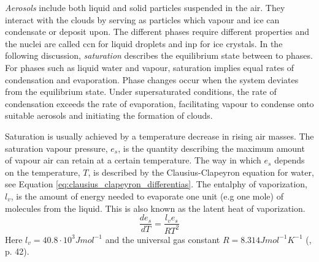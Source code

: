 \textit{Aerosols} include both liquid and solid particles suspended in the air. They interact with the clouds by serving as particles which vapour and ice can condensate or deposit upon. The different phases require different properties and the nuclei are called \acrfull{ccn} for liquid droplets and \acrfull{inp} for ice crystals. 
In the following discussion, \textit{saturation} describes the equilibrium state between to phases. %
For phases such as liquid water and vapour, saturation implies equal rates of condensation and evaporation. Phase changes occur when the system deviates from the equilibrium state. Under supersaturated conditions, the rate of condensation exceeds the rate of evaporation, facilitating vapour to condense onto suitable aerosols and initiating the formation of clouds. 

Saturation is usually achieved by a temperature decrease in rising air masses. The saturation vapour pressure, $e_s$, is the quantity describing the maximum amount of vapour air can retain at a certain temperature. The way in which $e_s$ depends on the temperature, $T$, is described by the Clausius-Clapeyron equation for water, see Equation \eqref{eq:clausius_clapeyron_differentias}. The entalphy of vaporization, $l_v$, is the amount of energy needed to evaporate one unit (e.g one mole) of molecules from the liquid. This is also known as the latent heat of vaporization. 
\begin{equation} \label{eq:clausius_clapeyron_differentias}
    \frac{de_s}{dT} = \frac{l_v e_s}{R T^2}
\end{equation}
Here $l_v = 40.8 \cdot 10^3 J mol^{-1}$ and the universal gas constant $R= 8.314 J mol^{-1} K^{-1}$ (\cite{cloud_phys_book_johanne}, p. 42). 

